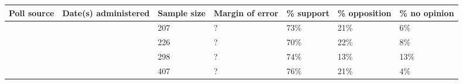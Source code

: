 \documentclass{article}
\begin{document}
\begin{tabular}{lllllll}
\toprule
Poll source & Date(s) administered & Sample size & Margin of error & \% support & \% opposition & \% no opinion \\
\midrule
 &  & 207 & ? & 73\% & 21\% & 6\% \\
 &  & 226 & ? & 70\% & 22\% & 8\% \\
 &  & 298 & ? & 74\% & 13\% & 13\% \\
 &  & 407 & ? & 76\% & 21\% & 4\% \\
\bottomrule
\end{tabular}
\end{document}
